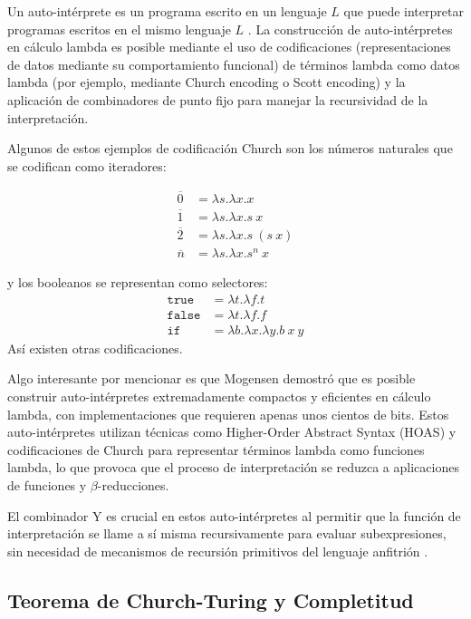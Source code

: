 \documentclass[11pt]{article}
\begin{document}
Un auto-intérprete es un programa escrito en un lenguaje $L$ que puede interpretar programas escritos en el mismo lenguaje $L$ \cite{mogensen1992}. La construcción de auto-intérpretes en cálculo lambda es posible mediante el uso de codificaciones (representaciones de datos mediante su comportamiento funcional) de términos lambda como datos lambda (por ejemplo, mediante Church encoding o Scott encoding) y la aplicación de combinadores de punto fijo para manejar la recursividad de la interpretación.

Algunos de estos ejemplos de codificaci\'on Church son los números naturales que se codifican como iteradores:

  \begin{align*}
      \overline{0} &= \lambda s.\lambda x.x \\
      \overline{1} &= \lambda s.\lambda x.s\ x \\
      \overline{2} &= \lambda s.\lambda x.s\ (s\ x) \\
      \overline{n} &= \lambda s.\lambda x.s^n\ x
  \end{align*}

  y los booleanos se representan como selectores:
  \begin{align*}
      \texttt{true} &= \lambda t.\lambda f.t \\
      \texttt{false} &= \lambda t.\lambda f.f \\
      \texttt{if} &= \lambda b.\lambda x.\lambda y.b\ x\ y
  \end{align*}
As\'i existen otras codificaciones.

Algo interesante por mencionar es que Mogensen \cite{mogensen1992} demostró que es posible construir auto-intérpretes extremadamente compactos y eficientes en cálculo lambda, con implementaciones que requieren apenas unos cientos de bits. Estos auto-intérpretes utilizan técnicas como Higher-Order Abstract Syntax (HOAS) y codificaciones de Church para representar términos lambda como funciones lambda, lo que provoca que el proceso de interpretación se reduzca a aplicaciones de funciones y $\beta$-reducciones.

El combinador Y es crucial en estos auto-intérpretes al permitir que la función de interpretación se llame a sí misma recursivamente para evaluar subexpresiones, sin necesidad de mecanismos de recursión primitivos del lenguaje anfitrión \cite{brown2016}.

\subsection{Teorema de Church-Turing y Completitud}
\end{document}

